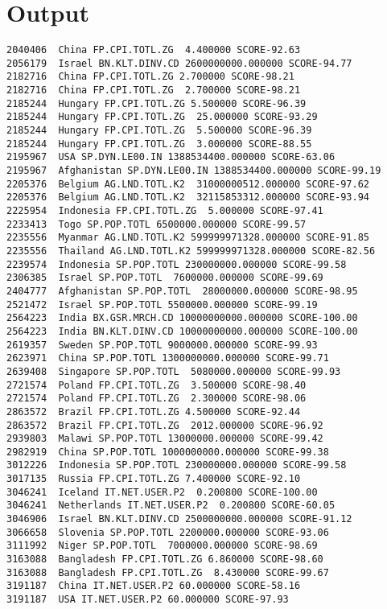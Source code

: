\documentclass{pracjourn}
\begin{document}
\section{Output}
\begin{lstlisting}
2040406  China FP.CPI.TOTL.ZG  4.400000 SCORE-92.63
2056179  Israel BN.KLT.DINV.CD 2600000000.000000 SCORE-94.77
2182716  China FP.CPI.TOTL.ZG 2.700000 SCORE-98.21
2182716  China FP.CPI.TOTL.ZG  2.700000 SCORE-98.21
2185244  Hungary FP.CPI.TOTL.ZG 5.500000 SCORE-96.39
2185244  Hungary FP.CPI.TOTL.ZG  25.000000 SCORE-93.29
2185244  Hungary FP.CPI.TOTL.ZG  5.500000 SCORE-96.39
2185244  Hungary FP.CPI.TOTL.ZG  3.000000 SCORE-88.55
2195967  USA SP.DYN.LE00.IN 1388534400.000000 SCORE-63.06
2195967  Afghanistan SP.DYN.LE00.IN 1388534400.000000 SCORE-99.19
2205376  Belgium AG.LND.TOTL.K2  31000000512.000000 SCORE-97.62
2205376  Belgium AG.LND.TOTL.K2  32115853312.000000 SCORE-93.94
2225954  Indonesia FP.CPI.TOTL.ZG  5.000000 SCORE-97.41
2233413  Togo SP.POP.TOTL 6500000.000000 SCORE-99.57
2235556  Myanmar AG.LND.TOTL.K2 599999971328.000000 SCORE-91.85
2235556  Thailand AG.LND.TOTL.K2 599999971328.000000 SCORE-82.56
2239574  Indonesia SP.POP.TOTL 230000000.000000 SCORE-99.58
2306385  Israel SP.POP.TOTL  7600000.000000 SCORE-99.69
2404777  Afghanistan SP.POP.TOTL  28000000.000000 SCORE-98.95
2521472  Israel SP.POP.TOTL 5500000.000000 SCORE-99.19
2564223  India BX.GSR.MRCH.CD 10000000000.000000 SCORE-100.00
2564223  India BN.KLT.DINV.CD 10000000000.000000 SCORE-100.00
2619357  Sweden SP.POP.TOTL 9000000.000000 SCORE-99.93
2623971  China SP.POP.TOTL 1300000000.000000 SCORE-99.71
2639408  Singapore SP.POP.TOTL  5080000.000000 SCORE-99.93
2721574  Poland FP.CPI.TOTL.ZG  3.500000 SCORE-98.40
2721574  Poland FP.CPI.TOTL.ZG  2.300000 SCORE-98.06
2863572  Brazil FP.CPI.TOTL.ZG 4.500000 SCORE-92.44
2863572  Brazil FP.CPI.TOTL.ZG  2012.000000 SCORE-96.92
2939803  Malawi SP.POP.TOTL 13000000.000000 SCORE-99.42
2982919  China SP.POP.TOTL 1000000000.000000 SCORE-99.38
3012226  Indonesia SP.POP.TOTL 230000000.000000 SCORE-99.58
3017135  Russia FP.CPI.TOTL.ZG 7.400000 SCORE-92.10
3046241  Iceland IT.NET.USER.P2  0.200800 SCORE-100.00
3046241  Netherlands IT.NET.USER.P2  0.200800 SCORE-60.05
3046906  Israel BN.KLT.DINV.CD 2500000000.000000 SCORE-91.12
3066658  Slovenia SP.POP.TOTL 2200000.000000 SCORE-93.06
3111992  Niger SP.POP.TOTL  7000000.000000 SCORE-98.69
3163088  Bangladesh FP.CPI.TOTL.ZG 6.860000 SCORE-98.60
3163088  Bangladesh FP.CPI.TOTL.ZG  8.430000 SCORE-99.67
3191187  China IT.NET.USER.P2 60.000000 SCORE-58.16
3191187  USA IT.NET.USER.P2 60.000000 SCORE-97.93

\end{lstlisting}
\end{document}
